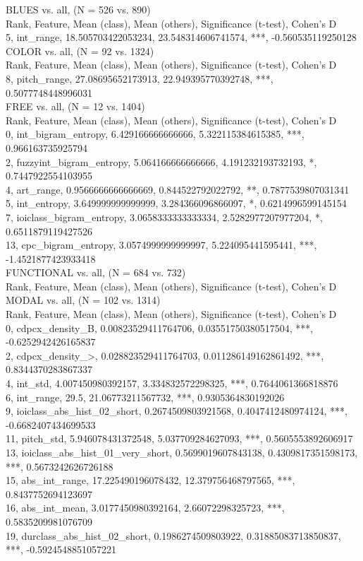 BLUES vs. all, (N = 526 vs. 890)\\
Rank, Feature, Mean (class), Mean (others), Significance (t-test), Cohen's D\\
5, int_range, 18.505703422053234, 23.548314606741574, ***, -0.560535119250128\\
COLOR vs. all, (N = 92 vs. 1324)\\
Rank, Feature, Mean (class), Mean (others), Significance (t-test), Cohen's D\\
8, pitch_range, 27.08695652173913, 22.949395770392748, ***, 0.5077748448996031\\
FREE vs. all, (N = 12 vs. 1404)\\
Rank, Feature, Mean (class), Mean (others), Significance (t-test), Cohen's D\\
0, int_bigram_entropy, 6.429166666666666, 5.322115384615385, ***, 0.966163735925794\\
2, fuzzyint_bigram_entropy, 5.064166666666666, 4.191232193732193, *, 0.7447922554103955\\
4, art_range, 0.9566666666666669, 0.844522792022792, **, 0.7877539807031341\\
5, int_entropy, 3.649999999999999, 3.284366096866097, *, 0.6214996599145154\\
7, ioiclass_bigram_entropy, 3.0658333333333334, 2.5282977207977204, *, 0.6511879119427526\\
13, cpc_bigram_entropy, 3.0574999999999997, 5.224095441595441, ***, -1.4521877423933418\\
FUNCTIONAL vs. all, (N = 684 vs. 732)\\
Rank, Feature, Mean (class), Mean (others), Significance (t-test), Cohen's D\\
MODAL vs. all, (N = 102 vs. 1314)\\
Rank, Feature, Mean (class), Mean (others), Significance (t-test), Cohen's D\\
0, cdpcx_density_B, 0.00823529411764706, 0.03551750380517504, ***, -0.6252942426165837\\
2, cdpcx_density_>, 0.028823529411764703, 0.011286149162861492, ***, 0.8344370283867337\\
4, int_std, 4.007450980392157, 3.334832572298325, ***, 0.7644061366818876\\
6, int_range, 29.5, 21.06773211567732, ***, 0.9305364830192026\\
9, ioiclass_abs_hist_02_short, 0.2674509803921568, 0.4047412480974124, ***, -0.6682407434699533\\
11, pitch_std, 5.946078431372548, 5.037709284627093, ***, 0.5605553892606917\\
13, ioiclass_abs_hist_01_very_short, 0.5699019607843138, 0.4309817351598173, ***, 0.5673242626726188\\
15, abs_int_range, 17.225490196078432, 12.379756468797565, ***, 0.8437752694123697\\
16, abs_int_mean, 3.0177450980392164, 2.66072298325723, ***, 0.5835209981076709\\
19, durclass_abs_hist_02_short, 0.1986274509803922, 0.31885083713850837, ***, -0.5924548851057221\\
